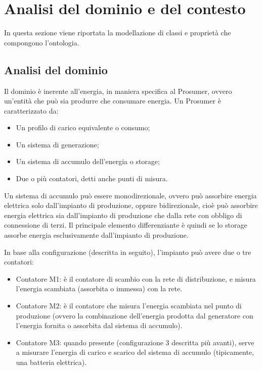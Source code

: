 \chapter{Analisi del dominio e del contesto}
In questa sezione viene riportata la modellazione di classi e proprietà che compongono l'ontologia.


\section{Analisi del dominio}\label{sec:analisi_dominio}
Il dominio è inerente all'energia, in maniera specifica al Prosumer, ovvero un'entità che può sia produrre che consumare energia.
Un Prosumer è caratterizzato da:

\begin{itemize}
    \item Un profilo di carico equivalente o consumo;
    \item Un sistema di generazione;
    \item Un sistema di accumulo dell'energia o storage;
    \item Due o più contatori, detti anche punti di misura.
\end{itemize}

Un sistema di accumulo può essere monodirezionale, ovvero può assorbire energia elettrica solo dall’impianto di produzione, oppure bidirezionale, cioè può assorbire energia elettrica sia dall’impianto di produzione che dalla rete con obbligo di connessione di terzi.
Il principale elemento differenziante è quindi se lo storage assorbe energia esclusivamente dall’impianto di produzione.

In base alla configurazione (descritta in seguito), l'impianto può avere due o tre contatori:
\begin{itemize}
    \item Contatore M1: è il contatore di scambio con la rete di distribuzione, e misura l’energia scambiata (assorbita o immessa) con la rete.
    \item Contatore M2: è il contatore che misura l’energia scambiata nel punto di produzione (ovvero la combinazione dell’energia prodotta dal generatore con l’energia fornita o assorbita dal sistema di accumulo).
    \item Contatore M3: quando presente (configurazione 3 descritta più avanti), serve a misurare l’energia di carico e scarico del sistema di accumulo (tipicamente, una batteria elettrica).
\end{itemize}

